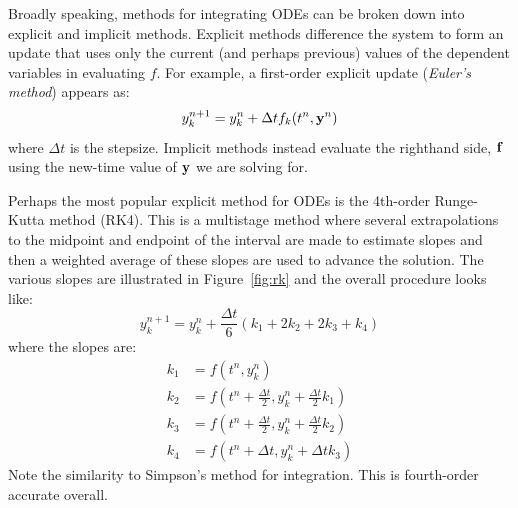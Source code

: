 Broadly speaking, methods for integrating ODEs can be broken down into
explicit and implicit methods.  Explicit methods difference the system
to form an update that uses only the current (and perhaps previous)
values of the dependent variables in evaluating $f$.  For example, a
first-order explicit update ({\em Euler's method}) appears as:
\begin{equation}
y^{n+1}_k = y^n_k + \Delta t f_k(t^n, {\bf y}^n)
\end{equation}
where $\Delta t$ is the stepsize.  Implicit methods instead evaluate
the righthand side, ${\bf f}$ using the new-time value of ${\bf y}$
we are solving for.

Perhaps the most popular explicit method for ODEs is the 4th-order
Runge-Kutta method (RK4).  This is a multistage method where several
extrapolations to the midpoint and endpoint of the interval are
made to estimate slopes and then a weighted average of these slopes
are used to advance the solution.  The various slopes
are illustrated in Figure~\ref{fig:rk} and the overall procedure looks like:
\begin{equation}
y_k^{n+1} = y_k^n + \frac{\Delta t}{6} (k_1 + 2 k_2 + 2 k_3 + k_4)
\end{equation}
where the slopes are:
\begin{align}
k_1 &= f(t^n, y_k^n) \\
k_2 &= f(t^n + \tfrac{\Delta t}{2}, y_k^n + \tfrac{\Delta t}{2} k_1) \\
k_3 &= f(t^n + \tfrac{\Delta t}{2}, y_k^n + \tfrac{\Delta t}{2} k_2) \\
k_4 &= f(t^n + \Delta t, y_k^n + \Delta t k_3)
\end{align}
Note the similarity to Simpson's method for integration.  This is
fourth-order accurate overall.

